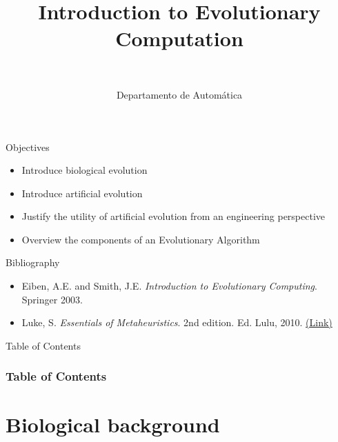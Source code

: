 \documentclass[10pt,compress]{beamer} %
\title[Introduction to Evolutionary Computation]{Introduction to Evolutionary Computation}
\author{\asignatura\\\carrera}
\institute{}
\date{Departamento de Automática}
\begin{document}
{\titlepageBlue
    \begin{frame}
        \titlepage
    \end{frame}
}

\institute{\asignatura}

\begin{frame}[plain]{}
   \begin{block}{Objectives}
       \begin{itemize}
        \item Introduce biological evolution
        \item Introduce artificial evolution
		\item Justify the utility of artificial evolution from an engineering perspective
		\item Overview the components of an Evolutionary Algorithm
       \end{itemize}
   \end{block}

   \begin{block}{Bibliography}
   		\begin{itemize}
       \item Eiben, A.E. and Smith, J.E. \emph{Introduction to Evolutionary Computing}. Springer 2003. 
     	\item Luke, S. \emph{Essentials of Metaheuristics}. 2nd edition. Ed. Lulu, 2010. \href{https://cs.gmu.edu/~sean/book/metaheuristics/Essentials.pdf}{(Link)}
   		\end{itemize}
   \end{block}
\end{frame}

{
\begin{frame}[shrink]{Table of Contents}
 \frametitle{Table of Contents}
 \tableofcontents
\end{frame}
}

\section{Biological background}
\end{document}
